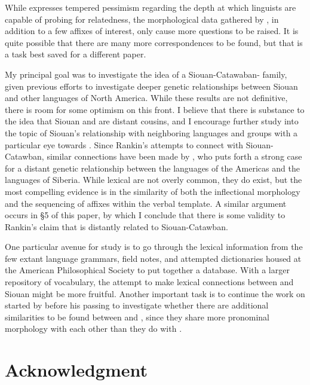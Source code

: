 \documentclass[output=paper]{LSP/langsci}
\begin{document}
While \citet{Rankin1996} expresses tempered pessimism regarding the depth at which linguists are capable of probing for relatedness, the morphological data gathered by \citet{Rankin1998scy}, in addition to a few affixes of interest, only cause more questions to be raised. It is quite possible that there are many more correspondences to be found, but that is a task best saved for a different paper.

My principal goal was to investigate the idea of a Siouan-Catawaban- family, given  previous efforts to investigate deeper genetic relationships between Siouan and other languages of North America. While these results are not definitive, there is room for some optimism on this front. I believe that there is substance to the idea that Siouan and  are distant cousins, and I encourage further study into the topic of Siouan's relationship with neighboring languages and groups with a particular eye towards . Since Rankin's attempts to connect  with Siouan-Catawban, similar connections have been made by \citet{Vajda2010}, who puts forth a strong case for a distant genetic relationship between the  languages of the Americas and the  languages of Siberia. While lexical  are not overly common, they do exist, but the most compelling evidence is in the similarity of both the inflectional morphology and the sequencing of affixes within the verbal template. A similar argument occurs in \S5 of this paper, by which I conclude that there is some validity to Rankin's claim that  is distantly related to Siouan-Catawban.

One particular avenue for study is to go through the lexical information from the few extant  language grammars, field notes, and attempted dictionaries housed at the American Philosophical Society to put together a  database. With a larger repository of  vocabulary, the attempt to make lexical connections between  and Siouan might be more fruitful. Another important task is to continue the work on  started by \citet{Rudes2007} before his passing to investigate whether there are additional similarities to be found between  and , since they share more pronominal morphology with each other than they do with .

\section*{Acknowledgment}
\end{document}
